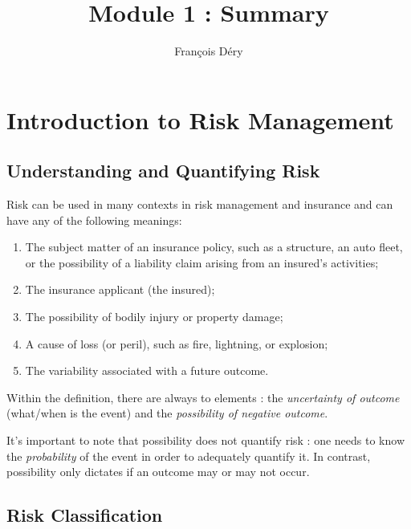 \documentclass[11pt, english]{memoir}
\numberwithin{definition}{section}
\begin{document}
	
\title{Module 1 : Summary}
\date{}
\author{François Déry}
\maketitle

	
	


\tableofcontents{}
\newpage


\chapter{Introduction to Risk Management}
\section{Understanding and Quantifying Risk}


Risk can be used in many contexts in risk management and insurance and can have any of the following meanings:

\begin{enumerate}
	\item The subject matter of an insurance policy, such as a structure, an auto fleet, or the possibility of a liability claim arising from an insured’s activities;
	\item The insurance applicant (the insured);
	\item The possibility of bodily injury or property damage;
	\item A cause of loss (or peril), such as fire, lightning, or explosion;
	\item The variability associated with a future outcome.
\end{enumerate}

Within the definition, there are always to elements : the \emph{uncertainty of outcome} (what/when is the event)  and the \emph{possibility of negative outcome}. 

It's important to note that possibility does not quantify risk : one needs to know the \emph{probability} of the event in order to adequately quantify it. In contrast, possibility only dictates if an outcome may or may not occur. 







\section{Risk Classification}
\end{document}

